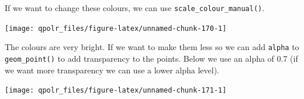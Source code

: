 \documentclass[12pt,oneside]{reedthesis}
\theoremstyle{definition}
\theoremstyle{definition}
\theoremstyle{definition}
\theoremstyle{remark}
\begin{document}
  If we want to change these colours, we can use
  \texttt{scale\_colour\_manual()}.
  \begin{Shaded}
  \begin{Highlighting}[]
  \NormalTok{(}\OperatorTok{+}
  \StringTok{  }\NormalTok{(}\NormalTok{(}\OperatorTok{+}\StringTok{ }
  \StringTok{  }\NormalTok{(}\NormalTok{, }\NormalTok{) }\OperatorTok{+}
  \StringTok{  }\NormalTok{() }\OperatorTok{+}
  \StringTok{  }\NormalTok{(} \NormalTok{(}\NormalTok{, }\NormalTok{, }\NormalTok{)) }
  \end{Highlighting}
  \end{Shaded}
  \begin{center}\texttt{[image: qpolr\_files/figure-latex/unnamed-chunk-170-1]} \end{center}
  
  The colours are very bright. If we want to make them less so we can add
  \texttt{alpha} to \texttt{geom\_point()} to add transparency to the
  points. Below we use an alpha of 0.7 (if we want more transparency we
  can use a lower alpha level).
  \begin{Shaded}
  \begin{Highlighting}[]
  \NormalTok{(}\OperatorTok{+}
  \StringTok{  }\NormalTok{(}\NormalTok{(}\NormalTok{) }\OperatorTok{+}\StringTok{ }
  \StringTok{  }\NormalTok{(}\NormalTok{, }\NormalTok{) }\OperatorTok{+}
  \StringTok{  }\NormalTok{() }\OperatorTok{+}
  \StringTok{  }\NormalTok{(} \NormalTok{(}\NormalTok{, }\NormalTok{, }\NormalTok{)) }
  \end{Highlighting}
  \end{Shaded}
  \begin{center}\texttt{[image: qpolr\_files/figure-latex/unnamed-chunk-171-1]} \end{center}
  
\end{document}
